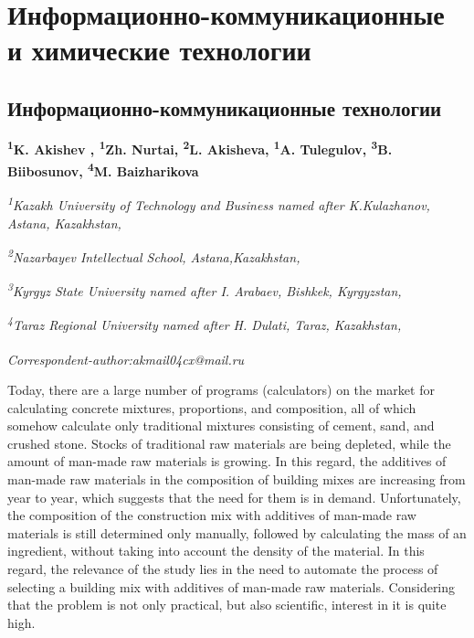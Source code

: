 \newpage
\let\cleardoublepage\clearpage
\part{Информационно-коммуникационные и химические технологии}
\chapter{Информационно-коммуникационные технологии}

\begin{articleheader}

{\bfseries
\textsuperscript{1}K. Akishev\textsuperscript{\envelope } ,
\textsuperscript{1}Zh. Nurtai,
\textsuperscript{2}L. Akisheva,
\textsuperscript{1}A. Tulegulov,
\textsuperscript{3}B. Biibosunov,
\textsuperscript{4}M. Baizharikova}
\end{articleheader}

\begin{affiliation}
\emph{\textsuperscript{1}Kazakh University of Technology and Business named after K.Kulazhanov, Astana, Kazakhstan,}

\emph{\textsuperscript{2}Nazarbayev Intellectual School, Astana,Kazakhstan,}

\emph{\textsuperscript{3}Kyrgyz State University named after I. Arabaev, Bishkek, Kyrgyzstan,}

\emph{\textsuperscript{4}Taraz Regional University named after H. Dulati, Taraz, Kazakhstan,}

\raggedright \textsuperscript{\envelope }{\em Correspondent-author:akmail04cx@mail.ru}
\end{affiliation}

Today, there are a large number of programs (calculators) on the market
for calculating concrete mixtures, proportions, and composition, all of
which somehow calculate only traditional mixtures consisting of cement,
sand, and crushed stone. Stocks of traditional raw materials are being
depleted, while the amount of man-made raw materials is growing. In this
regard, the additives of man-made raw materials in the composition of
building mixes are increasing from year to year, which suggests that the
need for them is in demand. Unfortunately, the composition of the
construction mix with additives of man-made raw materials is still
determined only manually, followed by calculating the mass of an
ingredient, without taking into account the density of the material. In
this regard, the relevance of the study lies in the need to automate the
process of selecting a building mix with additives of man-made raw
materials. Considering that the problem is not only practical, but also
scientific, interest in it is quite high.

